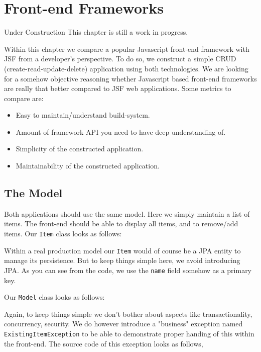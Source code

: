 %

\chapter{Front-end Frameworks}
\begin{TODO}{Under Construction}
	This chapter is still a work in progress.
\end{TODO}
Within this chapter we compare a popular Javascript front-end framework with JSF from a developer's perspective.
To do so, we construct a simple CRUD (create-read-update-delete) application using both technologies.
We are looking for a somehow objective reasoning whether Javascript based front-end frameworks are really that better compared to JSF web applications.
Some metrics to compare are:
\begin{itemize}
	\item Easy to maintain/understand build-system.
	\item Amount of framework API you need to have deep understanding of.
	\item Simplicity of the constructed application.
	\item Maintainability of the constructed application.
\end{itemize}

\section{The Model}
Both applications should use the same model.
Here we simply maintain a list of items.
The front-end should be able to display all items, and to remove/add items.
Our \texttt{Item} class looks as follows:

Within a real production model our \texttt{Item} would of course be a JPA entity to manage its persistence.
But to keep things simple here, we avoid introducing JPA.
As you can see from the code, we use the \texttt{name} field somehow as a primary key.

Our \texttt{Model} class looks as follows:

Again, to keep things simple we don't bother about aspects like transactionality, concurrency, security.
We do however introduce a "business" exception named \texttt{ExistingItem\allowbreak Exception} to be able to demonstrate proper handing of this within the front-end.
The source code of this exception looks as follows,


